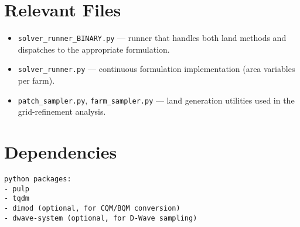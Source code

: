 \documentclass[11pt,a4paper]{article}
\begin{document}
\appendix
\section{Relevant Files}
\begin{itemize}
    \item \texttt{solver\_runner\_BINARY.py} — runner that handles both land methods and dispatches to the appropriate formulation.
    \item \texttt{solver\_runner.py} — continuous formulation implementation (area variables per farm).
    \item \texttt{patch\_sampler.py}, \texttt{farm\_sampler.py} — land generation utilities used in the grid-refinement analysis.
\end{itemize}

\section{Dependencies}
\begin{lstlisting}
python packages:
- pulp
- tqdm
- dimod (optional, for CQM/BQM conversion)
- dwave-system (optional, for D-Wave sampling)
\end{lstlisting}
\end{document}
